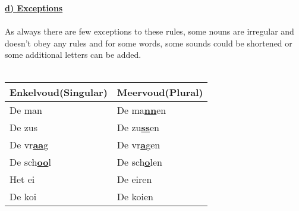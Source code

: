 \documentclass[a4paper,14pt]{extarticle}
\newcommand{\emp}[1]{\underline{\textbf{#1}}}
\begin{document}
\emp{d) Exceptions} \\ \\
As always there are few exceptions to these rules, some nouns are irregular and doesn't obey any rules and for some words, some sounds could be shortened or some additional letters can be added. \\ \\
\begin{tabularx}{\textwidth}{ p{} p{} }
 \hline
 Enkelvoud(Singular) & Meervoud(Plural)\\
 \hline
 De man & De ma\emp{nn}en \\
 De zus & De zu\emp{ss}en \\
 De vr\emp{aa}g & De vr\emp{a}gen \\
 De sch\emp{oo}l & De sch\emp{o}len \\
 Het ei & De eiren \\
 De koi & De koien \\
\end{tabularx}
\newpage
\end{document}
